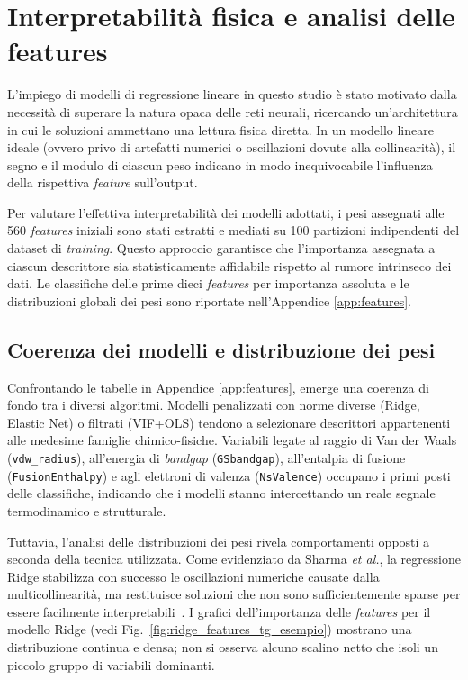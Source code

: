 \documentclass[../main.tex]{subfiles}
\begin{document}
	
	
	\section{Interpretabilità fisica e analisi delle features}
	\label{sec:interpretabilita}
	
	L'impiego di modelli di regressione lineare in questo studio è stato motivato dalla necessità di superare la natura opaca delle reti neurali, ricercando un'architettura in cui le soluzioni ammettano una lettura fisica diretta. In un modello lineare ideale (ovvero privo di artefatti numerici o oscillazioni dovute alla collinearità), il segno e il modulo di ciascun peso indicano in modo inequivocabile l'influenza della rispettiva \textit{feature} sull'output.
	
	Per valutare l'effettiva interpretabilità dei modelli adottati, i pesi assegnati alle 560 \textit{features} iniziali sono stati estratti e mediati su 100 partizioni indipendenti del dataset di \textit{training}. Questo approccio garantisce che l'importanza assegnata a ciascun descrittore sia statisticamente affidabile rispetto al rumore intrinseco dei dati. Le classifiche delle prime dieci \textit{features} per importanza assoluta e le distribuzioni globali dei pesi sono riportate nell'Appendice \ref{app:features}.
	
	\subsection{Coerenza dei modelli e distribuzione dei pesi}
	
	Confrontando le tabelle in Appendice \ref{app:features}, emerge una coerenza di fondo tra i diversi algoritmi. Modelli penalizzati con norme diverse (Ridge, Elastic Net) o filtrati (VIF+OLS) tendono a selezionare descrittori appartenenti alle medesime famiglie chimico-fisiche. Variabili legate al raggio di Van der Waals (\texttt{vdw\_radius}), all'energia di \textit{bandgap} (\texttt{GSbandgap}), all'entalpia di fusione (\texttt{FusionEnthalpy}) e agli elettroni di valenza (\texttt{NsValence}) occupano i primi posti delle classifiche, indicando che i modelli stanno intercettando un reale segnale termodinamico e strutturale.
	
	Tuttavia, l'analisi delle distribuzioni dei pesi rivela comportamenti opposti a seconda della tecnica utilizzata. Come evidenziato da Sharma \textit{et al.}, la regressione Ridge stabilizza con successo le oscillazioni numeriche causate dalla multicollinearità, ma restituisce soluzioni che non sono sufficientemente sparse per essere facilmente interpretabili~\cite{sharmaInterpretabilityLinearRegression2026}. I grafici dell'importanza delle \textit{features} per il modello Ridge (vedi Fig.~\ref{fig:ridge_features_tg_esempio}) mostrano una distribuzione continua e densa; non si osserva alcuno scalino netto che isoli un piccolo gruppo di variabili dominanti.
	
\end{document}
